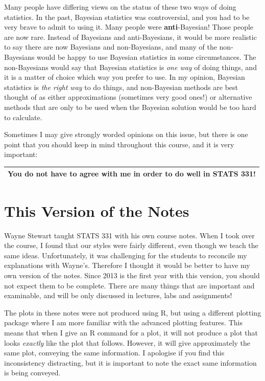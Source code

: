 Many
people have differing views on the status of these two ways of doing statistics.
In the past, Bayesian statistics was controversial, and you had to be very
brave to admit to using it. Many people were {\bf anti}-Bayesian!
Those people are now
rare. Instead of Bayesians and anti-Bayesians, it would be more realistic to
say there are now Bayesians and non-Bayesians, and many of the non-Bayesians
would be happy to use Bayesian statistics in some circumstances.
The non-Bayesians would say that
Bayesian statistics is {\it one way} of doing things, and it is a matter of
choice which way you prefer to use. In my opinion, Bayesian
statistics is {\it the right way} to do things, and non-Bayesian methods are
best thought of as either approximations (sometimes very good ones!)
or alternative methods that are only to be used when the Bayesian solution
would be too hard to calculate.

Sometimes I may give strongly worded opinions on this issue, but
there is one point that you should keep in mind throughout
this course, and it is very important:

\begin{center}
\begin{tabular}{|c|}
\hline
{\bf You do not have to agree with me in order to do well in STATS 331!}\\
\hline
\end{tabular}
\end{center}

\section{This Version of the Notes}
Wayne Stewart taught STATS 331 with his own course notes. When I took over the
course, I found that our styles were fairly different, even though we teach
the same ideas. Unfortunately, it was challenging for the students to reconcile
my explanations with Wayne's. Therefore I thought it would be better to have
my own version of the notes. Since 2013 is the first year with this version, you
should not expect them to be complete. There are many things that are important
and examinable, and will be only discussed in lectures, labs and assignments!

The plots in these notes were not produced using R, but using a different
plotting package where I am more familiar with the advanced plotting features.
This means that when I give an R command for a plot,
it will not produce a plot that looks {\it exactly} like the plot that follows.
However, it will give approximately the same plot, conveying the same information.
I apologise if you find this inconsistency distracting, but it is important to
note the exact same information is being conveyed.

